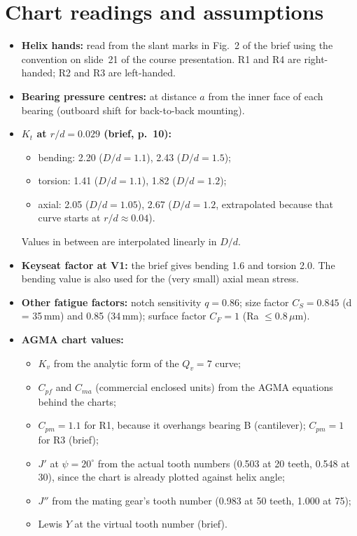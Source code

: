 \documentclass[11pt,a4paper]{article}
\begin{document}
\section{Chart readings and assumptions}
\begin{itemize}
\item \textbf{Helix hands:} read from the slant marks in Fig.~2 of the brief using the convention on slide~21 of the course presentation. R1 and R4 are right-handed; R2 and R3 are left-handed.
\item \textbf{Bearing pressure centres:} at distance $a$ from the inner face of each bearing (outboard shift for back-to-back mounting).
\item \textbf{$K_t$ at $r/d=0.029$ (brief, p.~10):}
  \begin{itemize}
  \item bending: 2.20 ($D/d=1.1$), 2.43 ($D/d=1.5$);
  \item torsion: 1.41 ($D/d=1.1$), 1.82 ($D/d=1.2$);
  \item axial: 2.05 ($D/d=1.05$), 2.67 ($D/d=1.2$, extrapolated because that curve starts at $r/d\approx0.04$).
  \end{itemize}
  Values in between are interpolated linearly in $D/d$.
\item \textbf{Keyseat factor at V1:} the brief gives bending 1.6 and torsion 2.0. The bending value is also used for the (very small) axial mean stress.
\item \textbf{Other fatigue factors:} notch sensitivity $q=0.86$; size factor $C_S=0.845$ (d = 35\,mm) and 0.85 (34\,mm); surface factor $C_F=1$ (Ra $\le0.8\,\mu$m).
\item \textbf{AGMA chart values:}
  \begin{itemize}
  \item $K_v$ from the analytic form of the $Q_v=7$ curve;
  \item $C_{pf}$ and $C_{ma}$ (commercial enclosed units) from the AGMA equations behind the charts;
  \item $C_{pm}=1.1$ for R1, because it overhangs bearing B (cantilever); $C_{pm}=1$ for R3 (brief);
  \item $J'$ at $\psi=20^\circ$ from the actual tooth numbers (0.503 at 20 teeth, 0.548 at 30), since the chart is already plotted against helix angle;
  \item $J''$ from the mating gear's tooth number (0.983 at 50 teeth, 1.000 at 75);
  \item Lewis $Y$ at the virtual tooth number (brief).

\end{itemize}
\end{itemize}
\end{document}
